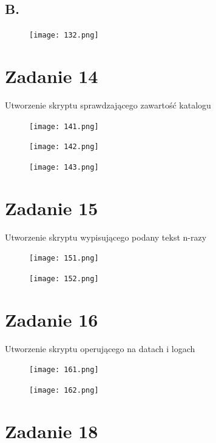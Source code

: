 \documentclass[fleqn,onecolumn,a4paper,12pt,titlepage]{article}
\begin{document}
\subsection*{B. } 
\begin{figure}[H]%
    \centering\texttt{[image: 132.png]}
\end{figure}

\section*{Zadanie 14}

Utworzenie skryptu sprawdzającego zawartość katalogu
\begin{figure}[H]%
    \centering\texttt{[image: 141.png]}
\end{figure}
\begin{figure}[H]%
    \centering\texttt{[image: 142.png]}
\end{figure}
\begin{figure}[H]%
    \centering\texttt{[image: 143.png]}
\end{figure}

\section*{Zadanie 15}

Utworzenie skryptu wypisującego podany tekst n-razy
\begin{figure}[H]%
    \centering\texttt{[image: 151.png]}
\end{figure}
\begin{figure}[H]%
    \centering\texttt{[image: 152.png]}
\end{figure}

\section*{Zadanie 16}

Utworzenie skryptu operującego na datach i logach
\begin{figure}[H]%
    \centering\texttt{[image: 161.png]}
\end{figure}
\begin{figure}[H]%
    \centering\texttt{[image: 162.png]}
\end{figure}

\section*{Zadanie 18}
\end{document}
